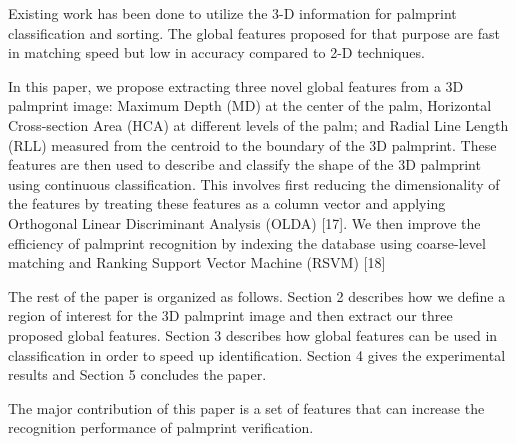 Existing work has been done to utilize the 3-D information for palmprint classification and sorting. The global features proposed for that purpose are fast in matching speed but low in accuracy compared to 2-D techniques.

In this paper, we propose extracting three novel global features from a 3D palmprint image: Maximum Depth (MD) at the center of the palm, Horizontal Cross-section Area (HCA) at different levels of the palm; and Radial Line Length (RLL) measured from the centroid to the boundary of the 3D palmprint. These features are then used to describe and classify the shape of the 3D palmprint using continuous classification. This involves first reducing the dimensionality of the features by treating these features as a column vector and applying Orthogonal Linear Discriminant Analysis (OLDA) [17]. We then improve the efficiency of palmprint recognition by indexing the database using coarse-level matching and Ranking Support Vector Machine (RSVM) [18]

The rest of the paper is organized as follows. Section 2 describes how we define a region of interest for the 3D palmprint image and then extract our three proposed global features. Section 3 describes how global features can be used in classification in order to speed up identification. Section 4 gives the experimental results and Section 5 concludes the paper.


The major contribution of this paper is a set of features that can increase the recognition performance of palmprint verification.
